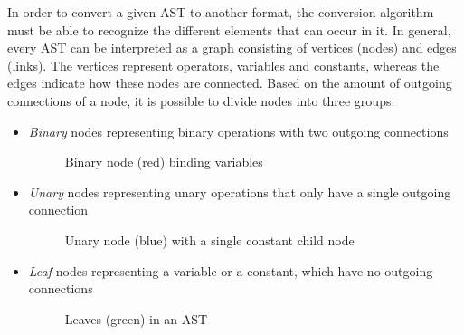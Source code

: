 In order to convert a given AST to another format, the conversion algorithm must be able to recognize the different elements that can occur in it. In general, every AST can be interpreted as a graph consisting of vertices (nodes) and edges (links). The vertices represent operators, variables and constants, whereas the edges indicate how these nodes are connected. Based on the amount of outgoing connections of a node, it is possible to divide nodes into three groups:
\begin{itemize}
    \item \emph{Binary} nodes representing binary operations with two outgoing connections
    \begin{figure}[H]
        \centering
        \caption{Binary node (red) binding variables}
        \label{fig:binaryNode}
    \end{figure}
    \item \emph{Unary} nodes representing unary operations that only have a single outgoing connection
    \begin{figure}[H]
        \centering
        \caption{Unary node (blue) with a single constant child node}
        \label{fig:unaryNode}
    \end{figure}
    \item \emph{Leaf}-nodes representing a variable or a constant, which have no outgoing connections
    \begin{figure}[H]
        \centering
        \caption{Leaves (green) in an AST}
        \label{fig:leaves}
    \end{figure}
\end{itemize}

